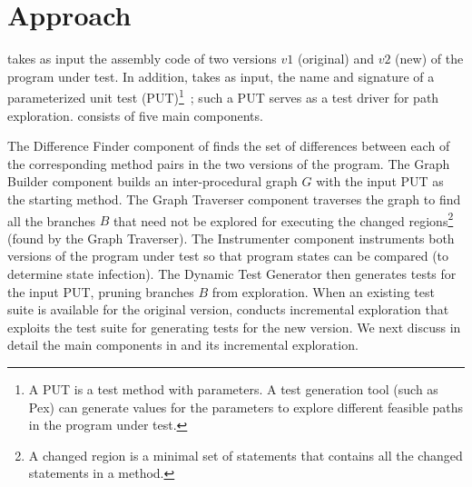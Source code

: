 \section{Approach}
\label{sec:approach}

 takes as input the assembly code of two versions $v1$ (original) and $v2$ (new) of the program under test. In addition,  takes as input, the name and signature of a parameterized unit test (PUT)\footnote{\scriptsize{A PUT is a test method with parameters. A test generation tool (such as Pex) can generate values for the parameters to explore different feasible paths in the program under test.}}~\cite{tillmann05:parameterized}; such a PUT serves as a test driver for path exploration.  consists of five main components.
 
The Difference Finder component of finds the set of differences between each of the corresponding method pairs in the two versions of the program. The Graph Builder component builds an inter-procedural graph $G$ with the input PUT as the starting method. The Graph Traverser component traverses the graph to find all the branches $B$ that need not be explored for executing the changed regions\footnote{\scriptsize{A changed region is a minimal set of statements that contains all the changed statements in a method.}} (found by the Graph Traverser). The Instrumenter
component instruments both versions of the program under test so
that program states can be compared (to determine state infection).
The Dynamic Test Generator then generates tests for the input PUT, pruning branches $B$ from exploration. When an existing test suite is available for the original version,  conducts incremental exploration that exploits the test suite for generating tests for the new version. We next discuss in detail the main components in  and its incremental exploration. 

